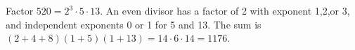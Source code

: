Factor $520=2^3\cdot5\cdot13$. An even divisor has a factor of 2 with exponent 1,2,or 3, and independent exponents 0 or 1 for 5 and 13. The sum is $(2+4+8)(1+5)(1+13)=14\cdot6\cdot14=\boxed{1176}$.
